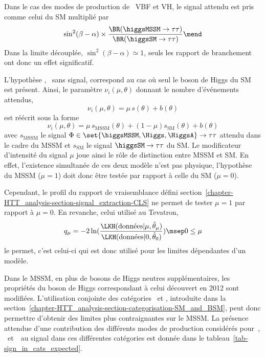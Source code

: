 Dans le cas des modes de production de \higgsMSSM\ VBF et VH,
le signal attendu est pris comme celui du SM multiplié par
\begin{equation}
\sin^2(\beta-\alpha) \times \frac{\BR(\higgsMSSM\to\tau\tau)}{\BR(\higgsSM\to\tau\tau)}
\mend
\end{equation}
Dans la limite découplée, $\sin^2(\beta-\alpha)\simeq1$, seuls les rapport de branchement ont donc un effet significatif.
\par
L'hypothèse \hypB, \ie\ sans signal, correspond au cas où seul le boson de Higgs du SM est présent.
Ainsi, le paramètre $\nu_i(\mu,\theta)$ donnant le nombre d'événements attendus,
\begin{equation}
\nu_i(\mu,\theta) = \mu \, s(\theta) + b(\theta)
\end{equation}
est réécrit sous la forme
\begin{equation}
\nu_i(\mu,\theta) = \mu \, s_\text{MSSM}(\theta) + (1-\mu)s_\text{SM}(\theta) + b(\theta)
\end{equation}
avec
$s_\text{MSSM}$ le signal $\Phi\in\set{\higgsMSSM,\Higgs,\HiggsA}\to\tau\tau$ attendu dans le cadre du MSSM
et
$s_\text{SM}$ le signal $\higgsSM\to\tau\tau$ du SM.
Le modificateur d'intensité du signal $\mu$ joue ainsi le rôle de distinction entre MSSM et SM.
En effet, l'existence simultanée de ces deux modèle n'est pas physique,
l'hypothèse du MSSM ($\mu=1$) doit donc être testée par rapport à celle du SM ($\mu=0$).
\par
Cependant, le profil du rapport de vraisemblance défini section~\ref{chapter-HTT_analysis-section-signal_extraction-CLS}
ne permet de tester $\mu=1$ par rapport à $\mu=0$.
En revanche, celui utilisé au Tevatron,
\begin{equation}
q_{\mu} = -2 \ln(\frac{\LKH(\text{données} |  \mu, \hat{\theta}_{\mu})}{\LKH(\text{données} |  0, \hat{\theta}_{0})})
\msep
0 \leq \mu
\end{equation}
le permet, c'est celui-ci qui est donc utilisé pour les limites dépendantes d'un modèle.
\par
Dans le MSSM, en plus de bosons de Higgs neutres supplémentaires, les propriétés du boson de Higgs correspondant à celui découvert en 2012 sont modifiées.
L'utilisation conjointe des catégories \CATsm\ et \CATbsm, introduite dans la section~\ref{chapter-HTT_analysis-section-categorisation-SM_and_BSM}, peut donc permettre d'obtenir des limites plus contraignantes sur le MSSM.
La présence attendue d'une contribution des différents modes de production considérés pour~\higgs, \Higgs\ et~\HiggsA\ au signal dans ces différentes catégories est donnée dans le tableau~\ref{tab-sign_in_cats_expected}.
